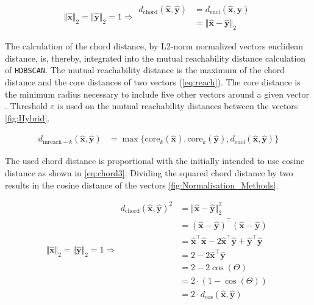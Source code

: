 \begin{equation}\label{eq:chord2}
    \Vert\mathbf{\hat{x}}\Vert_2 = \Vert\mathbf{\hat{y}}\Vert_2 = 1 \Rightarrow 
    \begin{aligned}
        d_{\text{chord}}(\mathbf{\hat{x}},\mathbf{\hat{y}}) &= d_{\text{eucl}}(\mathbf{\hat{x}},\mathbf{\hat{y}})\\
        &= \Vert\mathbf{\hat{x}} - \mathbf{\hat{y}}\Vert_2
    \end{aligned}
\end{equation}

The calculation of the chord distance, by L2-norm normalized vectors euclidean distance, is, thereby, integrated into the mutual reachability distance calculation of \texttt{HDBSCAN}. The mutual reachability distance is the maximum of the chord distance and the core distances of two vectors (\autoref{eq:reach}). The core distance is the minimum radius necessary to include five other vectors around a given vector \autocite{mcinnes_hdbscan_2017}. Threshold $\varepsilon$ is used on the mutual reachability distances between the vectors \autoref{fig:Hybrid}. 

\begin{equation}\label{eq:reach}
    \begin{aligned}
        d_{\text{mreach}-k}(\mathbf{\hat{x}},\mathbf{\hat{y}}) &= \max \{ \text{core}_k(\mathbf{\hat{x}}), \text{core}_k(\mathbf{\hat{y}}), d_{\text{eucl}}(\mathbf{\hat{x}},\mathbf{\hat{y}}) \}
    \end{aligned}
\end{equation}

The used chord distance is proportional with the initially intended to use cosine distance as shown in \autoref{eq:chord3}. Dividing the squared chord distance by two results in the cosine distance of the vectors \autoref{fig:Normalisation_Methods}.

\begin{equation}\label{eq:chord3}
    \Vert\mathbf{\hat{x}}\Vert_2 = \Vert\mathbf{\hat{y}}\Vert_2 = 1 \Rightarrow 
    \begin{aligned}  
        d_{\text{chord}}(\mathbf{\hat{x}},\mathbf{\hat{y}})^2 &= \Vert\mathbf{\hat{x}} - \mathbf{\hat{y}}\Vert_2^2\\
        &= (\mathbf{\hat{x}} - \mathbf{\hat{y}})^\top (\mathbf{\hat{x}} - \mathbf{\hat{y}})\\
        &= \mathbf{\hat{x}}^\top \mathbf{\hat{x}} - 2 \mathbf{\hat{x}}^\top \mathbf{\hat{y}} + \mathbf{\hat{y}}^\top \mathbf{\hat{y}}\\
        &= 2 - 2\mathbf{\hat{x}}^\top \mathbf{\hat{y}}\\
        &= 2 - 2 \cos(\Theta)\\
        &= 2 \cdot (1 - \cos(\Theta))\\
        &= 2 \cdot d_{\text{cos}}(\mathbf{\hat{x}},\mathbf{\hat{y}})
    \end{aligned}
\end{equation}

